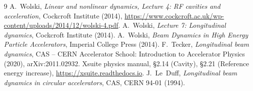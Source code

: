 \documentclass[a4paper,11pt]{article}
\numberwithin{equation}{section}
\begin{document}
\begin{thebibliography}{9}
 A.~Wolski, \emph{Linear and nonlinear dynamics, Lecture 4: RF cavities and acceleration},
Cockcroft Institute (2014), \url{https://www.cockcroft.ac.uk/wp-content/uploads/2014/12/wolski-4.pdf}.
 A.~Wolski, \emph{Lecture 7: Longitudinal dynamics}, Cockcroft Institute (2014).
 A.~Wolski, \emph{Beam Dynamics in High Energy Particle Accelerators}, Imperial College Press (2014).
 F.~Tecker, \emph{Longitudinal beam dynamics}, CAS -- CERN Accelerator School:
Introduction to Accelerator Physics (2020), arXiv:2011.02932.
 Xsuite physics manual, \S2.14 (Cavity), \S2.21 (Reference energy increase),
\url{https://xsuite.readthedocs.io}.
 J.~Le~Duff, \emph{Longitudinal beam dynamics in circular accelerators}, CAS, CERN 94-01 (1994).
\end{thebibliography}
\end{document}
